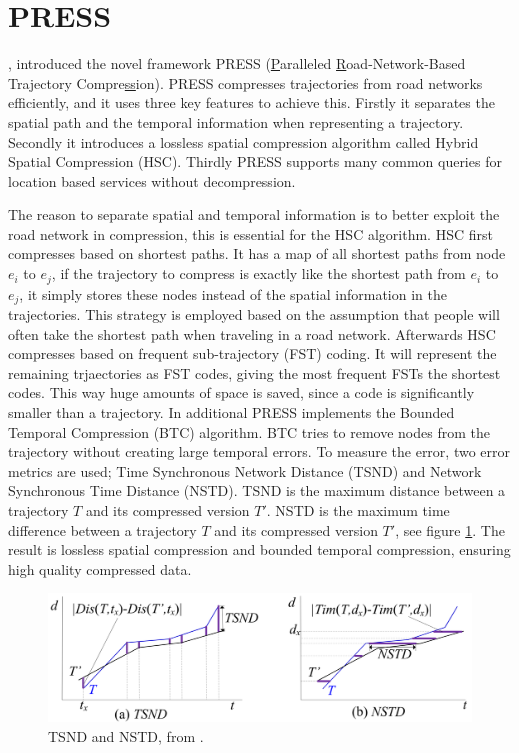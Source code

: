 \section{PRESS}
\cite{song2014press}, introduced the novel framework PRESS (\underline{P}aralleled \underline{R}oad-Network-Based Trajectory Compre\underline{ss}ion). PRESS compresses trajectories from road networks efficiently, and it uses three key features to achieve this. Firstly it separates the spatial path and the temporal information when representing a trajectory. Secondly it introduces a lossless spatial compression algorithm called Hybrid Spatial Compression (HSC). Thirdly PRESS supports many common queries for location based services without decompression.

The reason to separate spatial and temporal information is to better exploit the road network in compression, this is essential for the HSC algorithm. HSC first compresses based on shortest paths. It has a map of all shortest paths from node $e_i$ to $e_j$, if the trajectory to compress is exactly like the shortest path from $e_i$ to $e_j$, it simply stores these nodes instead of the spatial information in the trajectories. This strategy is employed based on the assumption that people will often take the shortest path when traveling in a road network. Afterwards HSC compresses based on frequent sub-trajectory (FST) coding. It will represent the remaining trjaectories as FST codes, giving the most frequent FSTs the shortest codes. This way huge amounts of space is saved, since a code is significantly smaller than a trajectory. In additional PRESS implements the Bounded Temporal Compression (BTC) algorithm. BTC tries to remove nodes from the trajectory without creating large temporal errors. To measure the error, two error metrics are used; Time Synchronous Network Distance (TSND) and Network Synchronous Time Distance (NSTD). TSND is the maximum distance between a trajectory $T$ and its compressed version $T'$. NSTD is the maximum time difference between a trajectory $T$ and its compressed version $T'$, see figure \ref{press_error}. The result is lossless spatial compression and bounded temporal compression, ensuring high quality compressed data.

\begin{figure}[t]
    \includegraphics[width=1.0\linewidth]{./figures/press_error.png}
    \caption{TSND and NSTD, from \cite{song2014press}.}
    \label{press_error}
\end{figure}

